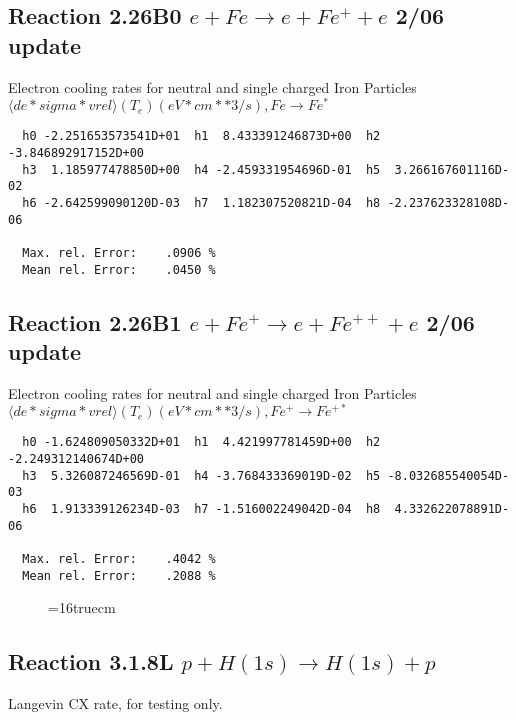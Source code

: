 \documentclass[12pt,dvipdfmx]{article}
\begin{document}
\subsection{
Reaction 2.26B0 $e + Fe  \rightarrow e + Fe^+  + e$ 2/06 update
}

  Electron cooling rates for neutral and single
  charged Iron Particles
 $ \langle de*sigma*vrel \rangle(T_e)  (eV*cm**3/s), Fe  \rightarrow Fe^* $

\begin{small}\begin{verbatim}
  h0 -2.251653573541D+01  h1  8.433391246873D+00  h2 -3.846892917152D+00
  h3  1.185977478850D+00  h4 -2.459331954696D-01  h5  3.266167601116D-02
  h6 -2.642599090120D-03  h7  1.182307520821D-04  h8 -2.237623328108D-06

  Max. rel. Error:    .0906 %
  Mean rel. Error:    .0450 %

\end{verbatim}\end{small}


\subsection{
Reaction 2.26B1 $e + Fe^+ \rightarrow e + Fe^{++} + e$ 2/06 update
}

  Electron cooling rates for neutral and single
  charged Iron Particles
 $  \langle de*sigma*vrel \rangle(T_e)  (eV*cm**3/s), Fe^+ \rightarrow Fe^{+*} $

\begin{small}\begin{verbatim}
  h0 -1.624809050332D+01  h1  4.421997781459D+00  h2 -2.249312140674D+00
  h3  5.326087246569D-01  h4 -3.768433369019D-02  h5 -8.032685540054D-03
  h6  1.913339126234D-03  h7 -1.516002249042D-04  h8  4.332622078891D-06

  Max. rel. Error:    .4042 %
  Mean rel. Error:    .2088 %

\end{verbatim}\end{small}

\begin{figure} \label{2.26Bl}
\epsfxsize=16truecm
\end{figure}
\newpage


\subsection{
Reaction 3.1.8L  $p + H(1s)  \rightarrow  H(1s) + p $
}
Langevin CX rate, for testing only.
\end{document}
